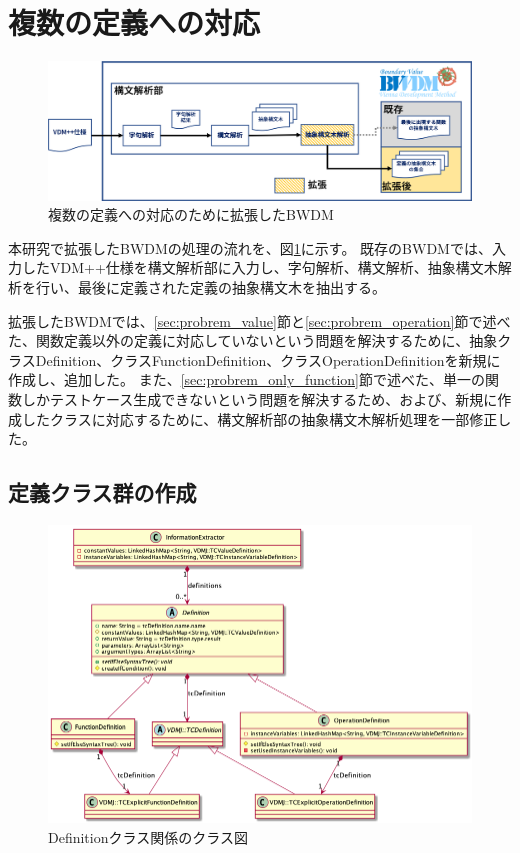 \documentclass[uplatex, report, a4j, 10pt]{jsbook}
\begin{document}
\section{複数の定義への対応}\label{sec:extendMultiple}
\begin{figure}[tp]
  \centering
  \includegraphics[keepaspectratio, width=160mm]{figs/multi_bwdm_structure}
  \caption{複数の定義への対応のために拡張したBWDM}
  \label{fig:multi_bwdm_structure}
\end{figure}

本研究で拡張したBWDMの処理の流れを、図\ref{fig:multi_bwdm_structure}に示す。
既存のBWDMでは、入力したVDM++仕様を構文解析部に入力し、字句解析、構文解析、抽象構文木解析を行い、最後に定義された定義の抽象構文木を抽出する。

拡張したBWDMでは、\ref{sec:probrem_value}節と\ref{sec:probrem_operation}節で述べた、関数定義以外の定義に対応していないという問題を解決するために、抽象クラスDefinition、クラスFunctionDefinition、クラスOperationDefinitionを新規に作成し、追加した。
また、\ref{sec:probrem_only_function}節で述べた、単一の関数しかテストケース生成できないという問題を解決するため、および、新規に作成したクラスに対応するために、構文解析部の抽象構文木解析処理を一部修正した。

\subsection{定義クラス群の作成}\label{sec:create_definition}
\begin{figure}[tp]
  \centering
  \includegraphics[keepaspectratio, width=160mm]{figs/Definition_class_diagram}
  \caption{Definitionクラス関係のクラス図}
  \label{fig:definition_class}
\end{figure}
\end{document}

